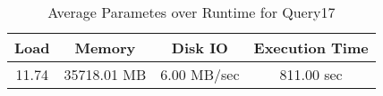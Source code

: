 \documentclass[../../main.tex]{subfiles}
\begin{document}
    \begin{table}
        \begin{center}
            \begin{tabular}{ |c|c|c|c| } 
            \hline
            Load & Memory & Disk IO & Execution Time\\
            \hline
            11.74 & 35718.01 MB & 6.00 MB/sec & 811.00 sec \\
            \hline
            \end{tabular}
            \\[1pt]
            \caption{Average Parametes over Runtime for Query17}
        \end{center}
    \end{table}
    \pagebreak
\end{document}
